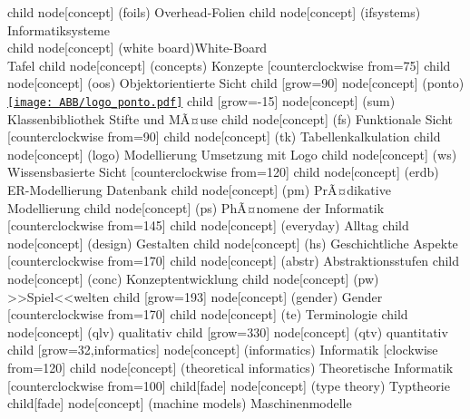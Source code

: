 \documentclass[german,landscape]{article}
\begin{document}
\begin{map}
\begin{scope}[a0 mindmap]
{{{{            child { node[concept] (foils)      {Overhead-Folien}                    }
            child { node[concept] (ifsystems)  {Informatik\-systeme \\ \href{http://www.ham.nw.schule.de/pub/bscw.cgi/114759}{\Mobilefone} }}
            child { node[concept] (white board){White-Board\\Tafel}                 }
          }
        }  
     }
     child { node[concept] (concepts) {Konzepte}
        [counterclockwise from=75]
        child { node[concept] (oos) {Objekt\-orientierte Sicht} 
            child [grow=90] { node[concept] (ponto){ \href{http://ham.nw.schule.de/pub/bscw.cgi/73468}{\texttt{[image: ABB/logo\_ponto.pdf]}}} }
            child [grow=-15] { node[concept] (sum)  {Klassen\-biblio\-thek Stifte und MÃ¤use}                         }
        }
        child { node[concept] (fs) {Funktionale Sicht} 
            [counterclockwise from=90]
            child  { node[concept] (tk)    {Tabellen\-kalkulation}           }
            child  { node[concept] (logo)  {Model\-lierung Umsetzung mit Logo} }
        }
        child { node[concept] (ws) {Wissensbasierte Sicht} 
            [counterclockwise from=120]
            child  { node[concept] (erdb) {ER-Modellierung Datenbank} }
            child  { node[concept] (pm)   {PrÃ¤dikative Modellierung}  }
        }
        child { node[concept] (ps) {PhÃ¤nomene der Informatik} 
            [counterclockwise from=145]
            child  { node[concept] (everyday) {Alltag}    }
            child  { node[concept] (design)   {Gestalten} }
        }
        child { node[concept] (hs) {Geschichtliche Aspekte} 
            [counterclockwise from=170]
            child  { node[concept] (abstr) {Abstraktions\-stufen}       }
            child  { node[concept] (conc)  {Kon\-zept\-ent\-wick\-lung} }
        }
        child { node[concept] (pw) {>>Spiel<<\-welten} }
     }
     child [grow=193] { node[concept] (gender) {Gender} 
        [counterclockwise from=170]
        child { node[concept] (te) {Terminologie}           }
        child { node[concept] (qlv) {qualitativ}            }
        child [grow=330]{ node[concept] (qtv) {quantitativ} }
     }
  }
  child [grow=32,informatics] { node[concept] (informatics) {Informatik}
    [clockwise from=120]
    child { node[concept] (theoretical informatics)  {Theoretische Informatik}
      [counterclockwise from=100]
      child[fade] { node[concept] (type theory)         {Typtheorie}              }
      child[fade] { node[concept] (machine models)      {Maschinen\-modelle}      }
}}
\end{scope}
\end{map}
\end{document}
